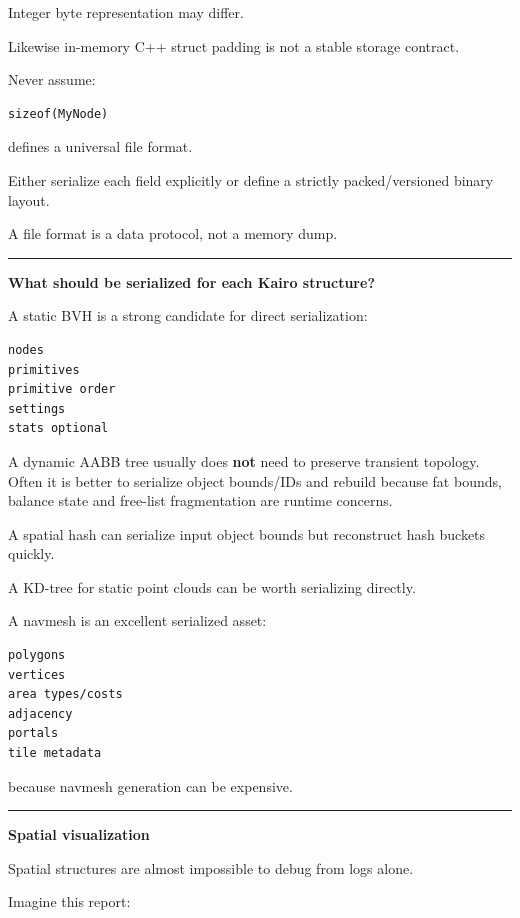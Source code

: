 Integer byte representation may differ.

Likewise in-memory C++ struct padding is not a stable storage contract.

Never assume:

\begin{verbatim}
sizeof(MyNode)
\end{verbatim}

defines a universal file format.

Either serialize each field explicitly or define a strictly packed/versioned binary layout.

A file format is a data protocol, not a memory dump.

\begin{center}\rule{0.5\linewidth}{0.5pt}\end{center}

\textbf{What should be serialized for each Kairo structure?}

A static BVH is a strong candidate for direct serialization:

\begin{verbatim}
nodes
primitives
primitive order
settings
stats optional
\end{verbatim}

A dynamic AABB tree usually does \textbf{not} need to preserve transient topology. Often it is better to serialize object bounds/IDs and rebuild because fat bounds, balance state and free-list fragmentation are runtime concerns.

A spatial hash can serialize input object bounds but reconstruct hash buckets quickly.

A KD-tree for static point clouds can be worth serializing directly.

A navmesh is an excellent serialized asset:

\begin{verbatim}
polygons
vertices
area types/costs
adjacency
portals
tile metadata
\end{verbatim}

because navmesh generation can be expensive.

\begin{center}\rule{0.5\linewidth}{0.5pt}\end{center}

\textbf{Spatial visualization}

Spatial structures are almost impossible to debug from logs alone.

Imagine this report:

